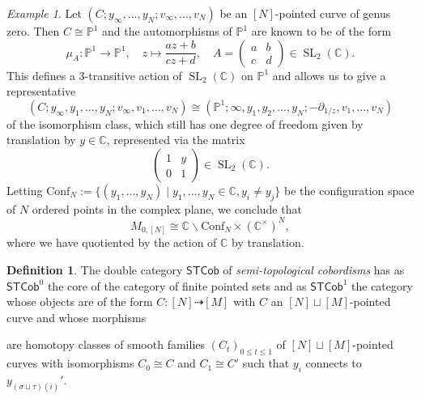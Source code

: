 \documentclass[11pt]{report}
\theoremstyle{definition}
\newtheorem{definition}[theorem]{Definition}
\theoremstyle{remark}
\theoremstyle{remark}
\newtheorem*{example}{Example}
\newcommand{\C}{\mathbb{C}}
\renewcommand{\P}{\mathbb{P}}
\begin{document}
\begin{example}
Let $(C;y_\infty,...,y_N;v_\infty,...,v_N)$ be an $[N]$-pointed curve of genus zero. Then $C \cong \P^1$ and the automorphisms of $\P^1$ are known to be of the form
\begin{equation*}
\mu_A: \P^1 \to \P^1, \quad z \mapsto \frac{az+b}{cz+d}, \quad
A =
\begin{pmatrix}
a & b \\ c & d
\end{pmatrix}
\in \operatorname{SL}_2(\C).
\end{equation*}
This defines a 3-transitive action of $\operatorname{SL}_2(\C)$ on $\P^1$ and allows us to give a representative
\begin{equation*}
(C;y_\infty,y_1,...,y_N;v_\infty,v_1,...,v_N) \cong (\P^1;\infty,y_1,y_2,...,y_N;-\partial_{1/z},v_1,...,v_N)
\end{equation*}
of the isomorphism class, which still has one degree of freedom given by translation by $y \in \C$, represented via the matrix
\begin{equation*}
\begin{pmatrix}
1 & y \\ 0 & 1
\end{pmatrix}
\in \operatorname{SL}_2(\C).
\end{equation*}
Letting $\text{Conf}_N := \{ (y_1,...,y_N) \mid y_1,...,y_N \in \C, y_i \neq y_j \}$ be the configuration space of $N$ ordered points in the complex plane, we conclude that
\begin{equation*}
M_{0,[N]} \cong \C \backslash \text{Conf}_N \times (\C^\times)^N,
\end{equation*}
where we have quotiented by the action of $\C$ by translation.
\end{example}

\begin{definition}
The double category $\mathsf{STCob}$ of \emph{semi-topological cobordisms} has as $\mathsf{STCob}^0$ the core of the category of finite pointed sets and as $\mathsf{STCob}^1$ the category whose objects are of the form $C: [N] \dashrightarrow [M]$ with $C$ an $[N] \sqcup [M]$-pointed curve and whose morphisms
\begin{center}
\end{center}
are homotopy classes of smooth families $(C_t)_{0 \leq t \leq 1}$ of $[N] \sqcup [M]$-pointed curves with isomorphisms $C_0 \cong C$ and $C_1 \cong C'$ such that $y_i$ connects to $y_{(\sigma \sqcup \tau)(i)}'$.
\end{definition}
\end{document}
